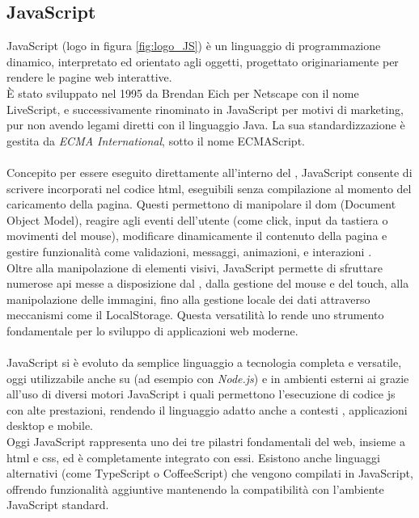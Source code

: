 \subsection{JavaScript}
\label{subsec:js}
\noindent JavaScript (logo in figura \ref{fig:logo_JS}) è un linguaggio di programmazione dinamico, interpretato ed orientato agli oggetti, progettato originariamente per rendere le pagine web interattive.\\ 
È stato sviluppato nel 1995 da Brendan Eich per Netscape con il nome LiveScript, e successivamente rinominato in JavaScript per motivi di marketing, pur non avendo legami diretti con il linguaggio Java. La sua standardizzazione è gestita da \textit{ECMA International}, sotto il nome ECMAScript.\\
\\
Concepito per essere eseguito direttamente all’interno del , JavaScript consente di scrivere  incorporati nel codice \acrshort{html}, eseguibili senza compilazione al momento del caricamento della pagina. Questi  permettono di manipolare il \acrshort{dom} (Document Object Model), reagire agli eventi dell’utente (come click, input da tastiera o movimenti del mouse), modificare dinamicamente il contenuto della pagina e gestire funzionalità come validazioni, messaggi, animazioni, e interazioni .\\
Oltre alla manipolazione di elementi visivi, JavaScript permette di sfruttare numerose \acrshort{api} messe a disposizione dal , dalla gestione del mouse e del touch, alla manipolazione delle immagini, fino alla gestione locale dei dati attraverso meccanismi come il LocalStorage. Questa versatilità lo rende uno strumento fondamentale per lo sviluppo di applicazioni web moderne.\\
\\
JavaScript si è evoluto da semplice linguaggio  a tecnologia completa e versatile, oggi utilizzabile anche su  (ad esempio con \textit{Node.js}) e in ambienti esterni ai  grazie all’uso di diversi motori JavaScript i quali permettono l’esecuzione di codice \acrshort{js} con alte prestazioni, rendendo il linguaggio adatto anche a contesti , applicazioni desktop e mobile.\\
Oggi JavaScript rappresenta uno dei tre pilastri fondamentali del web, insieme a \acrshort{html} e \acrshort{css}, ed è completamente integrato con essi. Esistono anche linguaggi alternativi (come TypeScript o CoffeeScript) che vengono compilati in JavaScript, offrendo funzionalità aggiuntive mantenendo la compatibilità con l’ambiente JavaScript standard.
